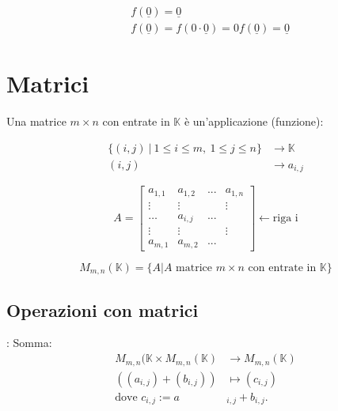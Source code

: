 \begin{osservazione}[2]

  \begin{align*}
    & f(\underline{0})=\underline{0} \\
    & f(\underline{0})=f(0\cdot \underline{0})=0f(\underline{0})=\underline{0}
  \end{align*}

\end{osservazione}


\section{Matrici}

\begin{definizione}[]
  Una matrice $m\times n$ con entrate in $\mathbb{K}$ è un'applicazione (funzione):

  \begin{align*}
    \{(i,j)\ |\ 1\leq i\leq m,\ 1\leq j\leq n\}&\to \mathbb{K}
    \label{eq:def_matrice} \\
    (i,j) &\to a_{i,j}
  \end{align*}

\end{definizione}

\begin{notazione}

  \begin{equation}
    A=\begin{bmatrix}
      a_{1,1} & a_{1,2} &... & a _{1,n} \\
      \vdots  & \vdots & &\vdots \\
      \dots   &  a _{i,j} &... \\
      \vdots  & \vdots & &\vdots \\
      a _{m,1} & a _{m,2} & ...
    \end{bmatrix} \leftarrow \text{riga i}
    \label{eq:notaz_matrice}
  \end{equation}

  \begin{equation}
    M _{m,n}(\mathbb{K}) = \{A | A \text{ matrice } m\times n \text{ con entrate in }\mathbb{K}\} \nonumber
    \label{eq:matrice_A2}
  \end{equation}

\end{notazione}

\subsection{Operazioni con matrici}
:
Somma:
\begin{align*}
  M _{m,n}(\mathbb{K}\times M _{m,n}(\mathbb{K}) &\to M _{m,n}(\mathbb{K}) \\
  ((a_{i,j})+(b_{i,j}))&\mapsto (c_{i,j}) \\
  \text{dove } c_{i,j} := a&_{i,j}+ b _{i,j}.
\end{align*}

